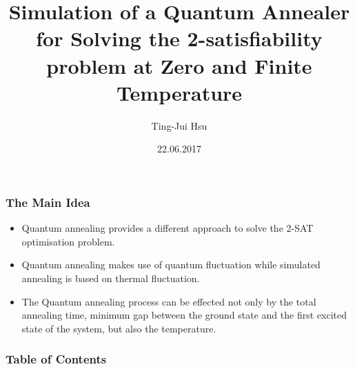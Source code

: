 \documentclass{beamer}
\title{Simulation of a Quantum Annealer for Solving the 2-satisfiability problem at Zero and Finite Temperature}
\author{Ting-Jui Hsu}
\institute{Quantum Information Group}
\date{22.06.2017}
\begin{document}
\frame{\titlepage}

\begin{frame}
	\frametitle{The Main Idea}
	\begin{itemize}
		\item Quantum annealing provides a different approach to solve the 2-SAT optimisation problem.\\
		\item Quantum annealing makes use of quantum fluctuation while simulated annealing is based on thermal fluctuation. \\
		\item The Quantum annealing process can be effected not only by the total annealing time, minimum gap between the ground state and the first excited state of the system, but also the temperature.
	\end{itemize}
\end{frame}




\begin{frame}
	\frametitle{Table of Contents}
	\tableofcontents
\end{frame}

\end{document}
